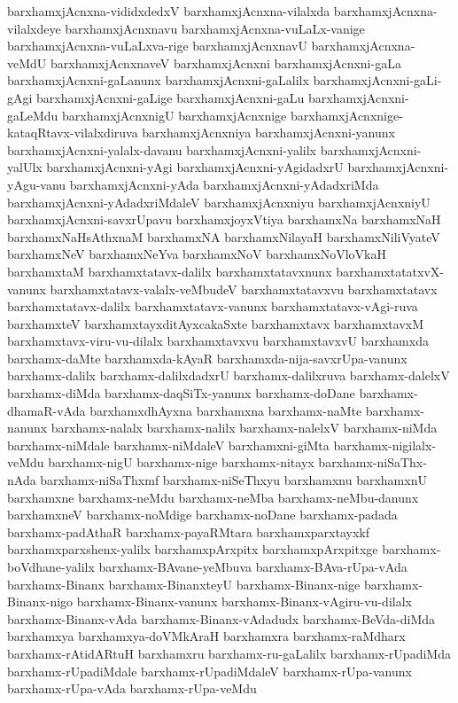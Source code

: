 {barxhamxjAcnxna-vididxdedxV
barxhamxjAcnxna-vilalxda
barxhamxjAcnxna-vilalxdeye
barxhamxjAcnxnavu
barxhamxjAcnxna-vuLaLx-vanige
barxhamxjAcnxna-vuLaLxva-rige
barxhamxjAcnxnavU
barxhamxjAcnxna-veMdU
barxhamxjAcnxnaveV
barxhamxjAcnxni
barxhamxjAcnxni-gaLa
barxhamxjAcnxni-gaLanunx
barxhamxjAcnxni-gaLalilx
barxhamxjAcnxni-gaLi-gAgi
barxhamxjAcnxni-gaLige
barxhamxjAcnxni-gaLu
barxhamxjAcnxni-gaLeMdu
barxhamxjAcnxnigU
barxhamxjAcnxnige
barxhamxjAcnxnige-kataqRtavx-vilalxdiruva
barxhamxjAcnxniya
barxhamxjAcnxni-yanunx
barxhamxjAcnxni-yalalx-davanu
barxhamxjAcnxni-yalilx
barxhamxjAcnxni-yalUlx
barxhamxjAcnxni-yAgi
barxhamxjAcnxni-yAgidadxrU
barxhamxjAcnxni-yAgu-vanu
barxhamxjAcnxni-yAda
barxhamxjAcnxni-yAdadxriMda
barxhamxjAcnxni-yAdadxriMdaleV
barxhamxjAcnxniyu
barxhamxjAcnxniyU
barxhamxjAcnxni-savxrUpavu
barxhamxjoyxVtiya
barxhamxNa
barxhamxNaH
barxhamxNaHsAthxnaM
barxhamxNA
barxhamxNilayaH
barxhamxNiliVyateV
barxhamxNeV
barxhamxNeYva
barxhamxNoV
barxhamxNoVloVkaH
barxhamxtaM
barxhamxtatavx-dalilx
barxhamxtatavxnunx
barxhamxtatatxvX-vanunx
barxhamxtatavx-valalx-veMbudeV
barxhamxtatavxvu
barxhamxtatavx
barxhamxtatavx-dalilx
barxhamxtatavx-vanunx
barxhamxtatavx-vAgi-ruva
barxhamxteV
barxhamxtayxditAyxcakaSxte
barxhamxtavx
barxhamxtavxM
barxhamxtavx-viru-vu-dilalx
barxhamxtavxvu
barxhamxtavxvU
barxhamxda
barxhamx-daMte
barxhamxda-kAyaR
barxhamxda-nija-savxrUpa-vanunx
barxhamx-dalilx
barxhamx-dalilxdadxrU
barxhamx-dalilxruva
barxhamx-dalelxV
barxhamx-diMda
barxhamx-daqSiTx-yanunx
barxhamx-doDane
barxhamx-dhamaR-vAda
barxhamxdhAyxna
barxhamxna
barxhamx-naMte
barxhamx-nanunx
barxhamx-nalalx
barxhamx-nalilx
barxhamx-nalelxV
barxhamx-niMda
barxhamx-niMdale
barxhamx-niMdaleV
barxhamxni-giMta
barxhamx-nigilalx-veMdu
barxhamx-nigU
barxhamx-nige
barxhamx-nitayx
barxhamx-niSaThx-nAda
barxhamx-niSaThxmf
barxhamx-niSeThxyu
barxhamxnu
barxhamxnU
barxhamxne
barxhamx-neMdu
barxhamx-neMba
barxhamx-neMbu-danunx
barxhamxneV
barxhamx-noMdige
barxhamx-noDane
barxhamx-padada
barxhamx-padAthaR
barxhamx-payaRMtara
barxhamxparxtayxkf
barxhamxparxshenx-yalilx
barxhamxpArxpitx
barxhamxpArxpitxge
barxhamx-boVdhane-yalilx
barxhamx-BAvane-yeMbuva
barxhamx-BAva-rUpa-vAda
barxhamx-Binanx
barxhamx-BinanxteyU
barxhamx-Binanx-nige
barxhamx-Binanx-nigo
barxhamx-Binanx-vanunx
barxhamx-Binanx-vAgiru-vu-dilalx
barxhamx-Binanx-vAda
barxhamx-Binanx-vAdadudx
barxhamx-BeVda-diMda
barxhamxya
barxhamxya-doVMkAraH
barxhamxra
barxhamx-raMdharx
barxhamx-rAtidARtuH
barxhamxru
barxhamx-ru-gaLalilx
barxhamx-rUpadiMda
barxhamx-rUpadiMdale
barxhamx-rUpadiMdaleV
barxhamx-rUpa-vanunx
barxhamx-rUpa-vAda
barxhamx-rUpa-veMdu
}
